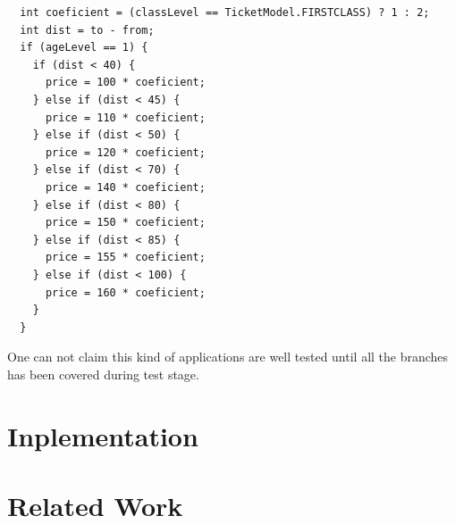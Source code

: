 \documentclass{article}
\begin{document}
\begin{lstlisting}
  int coeficient = (classLevel == TicketModel.FIRSTCLASS) ? 1 : 2;
  int dist = to - from;
  if (ageLevel == 1) {
    if (dist < 40) {
      price = 100 * coeficient;
    } else if (dist < 45) {
      price = 110 * coeficient;
    } else if (dist < 50) {
      price = 120 * coeficient;
    } else if (dist < 70) {
      price = 140 * coeficient;
    } else if (dist < 80) {
      price = 150 * coeficient;
    } else if (dist < 85) {
      price = 155 * coeficient;
    } else if (dist < 100) {
      price = 160 * coeficient;
    }
  }
\end{lstlisting}

One can not claim this kind of applications are well tested until all the branches has been covered during test stage.


\section{Inplementation}


\section{Related Work}\label{section:relatedwork}



\end{document}
